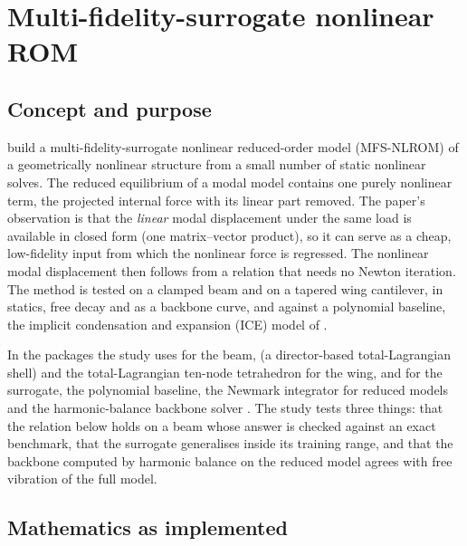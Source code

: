 \section{Multi-fidelity-surrogate nonlinear ROM}\label{sec:vf-mfs}

\subsection*{Concept and purpose}

\citet{he2023mfsnlrom} build a multi-fidelity-surrogate nonlinear reduced-order model (MFS-NLROM) of a geometrically nonlinear structure from a small number of static nonlinear solves. The reduced equilibrium of a modal model contains one purely nonlinear term, the projected internal force with its linear part removed. The paper's observation is that the \emph{linear} modal displacement under the same load is available in closed form (one matrix--vector product), so it can serve as a cheap, low-fidelity input from which the nonlinear force is regressed. The nonlinear modal displacement then follows from a relation that needs no Newton iteration. The method is tested on a clamped beam and on a tapered wing cantilever, in statics, free decay and as a backbone curve, and against a polynomial baseline, the implicit condensation and expansion (ICE) model of .

In the packages the study uses  for the beam,  (a director-based total-Lagrangian shell) and the total-Lagrangian ten-node tetrahedron for the wing, and \rom{} for the surrogate, the polynomial baseline, the Newmark integrator for reduced models and the harmonic-balance backbone solver . The study tests three things: that the relation below holds on a beam whose answer is checked against an exact benchmark, that the surrogate generalises inside its training range, and that the backbone computed by harmonic balance on the reduced model agrees with free vibration of the full model.

\subsection*{Mathematics as implemented}

